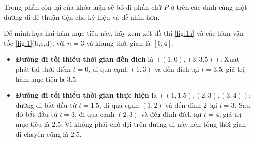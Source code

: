 \documentclass[../main.tex]{subfiles}
\begin{document}
Trong phần còn lại của khóa luận sẽ bỏ đi phần chữ \(P\) ở trên các đỉnh cùng một đường đi để thuận tiện cho ký hiệu và dễ nhìn
hơn.

Để minh họa hai hàm mục tiêu này, hãy xem xét đồ thị \autoref{fig:1a} và các hàm vận tốc 
\autoref{fig:1}(b,c,d), với \(n = 3\) và khung thời gian
là \([0, 4]\).

\begin{itemize}
\tightlist
\item
  \textbf{Đường đi tối thiểu thời gian đến đích} là
  \(((1, 0), (3, 3.5))\): Xuất phát tại thời điểm \(t = 0\), đi qua cạnh
  \((1, 3)\) và đến đích tại \(t = 3.5\), giá trị hàm mục tiêu là
  \(3.5\).
\item
  \textbf{Đường đi tối thiểu thời gian thực hiện} là
  \(((1, 1.5), (2, 3), (3, 4))\): đường đi bắt đầu từ \(t = 1.5\), đi
  qua cạnh \((1, 2)\) và đến đỉnh \(2\) tại \(t = 3\). Sau đó bắt đầu từ
  \(t = 3\), đi qua cạnh \((2, 3)\) và đến đỉnh đích tại \(t = 4\), giá
  trị mục tiêu là \(2.5\). Vì không phải chờ đợi trên đường đi này nên
  tổng thời gian di chuyển cũng là \(2.5\).
\end{itemize}
\end{document}
